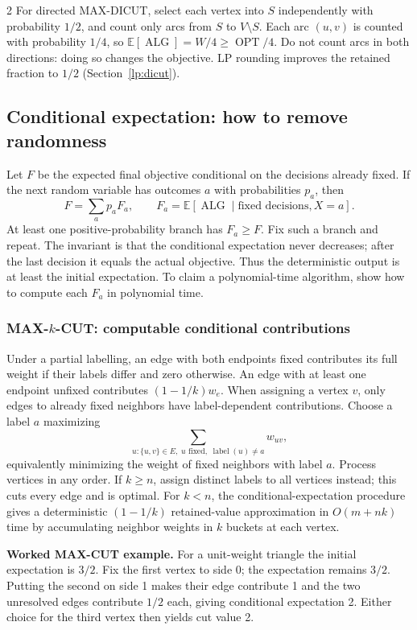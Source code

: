 \documentclass[8pt]{extarticle}
\theoremstyle{definition}
\newcommand{\OPT}{\operatorname{OPT}}
\newcommand{\ALG}{\operatorname{ALG}}
\begin{document}
\begin{multicols*}{2}
For directed MAX-DICUT, select each vertex into $S$ independently with
probability $1/2$, and count only arcs from $S$ to $V\setminus S$.
Each arc $(u,v)$ is counted with probability $1/4$, so
$\mathbb E[\ALG]=W/4\ge\OPT/4$.
Do not count arcs in both directions: doing so changes the objective.
LP rounding improves the retained fraction to $1/2$
(Section~\ref{lp:dicut}).

\subsection{Conditional expectation: how to remove randomness}\label{ra:conditional}
Let $F$ be the expected final objective conditional on the decisions already
fixed. If the next random variable has outcomes $a$ with probabilities $p_a$,
then
\[
  F=\sum_a p_a F_a,\qquad
  F_a=\mathbb E[\ALG\mid\text{fixed decisions},X=a].
\]
At least one positive-probability branch has $F_a\ge F$. Fix such a branch and
repeat. The invariant is that the conditional expectation never decreases;
after the last decision it equals the actual objective. Thus the deterministic
output is at least the initial expectation. To claim a polynomial-time
algorithm, show how to compute each $F_a$ in polynomial time.

\subsubsection*{MAX-$k$-CUT: computable conditional contributions}
Under a partial labelling, an edge with both endpoints fixed contributes its
full weight if their labels differ and zero otherwise. An edge with at least
one endpoint unfixed contributes $(1-1/k)w_e$. When assigning a vertex $v$,
only edges to already fixed neighbors have label-dependent contributions.
Choose a label $a$ maximizing
\[
  \sum_{u:\{u,v\}\in E,\;u\text{ fixed},\;\operatorname{label}(u)\ne a}w_{uv},
\]
equivalently minimizing the weight of fixed neighbors with label $a$.
Process vertices in any order. If $k\ge n$, assign distinct labels to all
vertices instead; this cuts every edge and is optimal. For $k<n$, the
conditional-expectation procedure gives a deterministic
$(1-1/k)$ retained-value approximation in $O(m+nk)$ time by accumulating
neighbor weights in $k$ buckets at each vertex.

\textbf{Worked MAX-CUT example.}
For a unit-weight triangle the initial expectation is $3/2$. Fix the first
vertex to side 0; the expectation remains $3/2$. Putting the second on side 1
makes their edge contribute 1 and the two unresolved edges contribute $1/2$
each, giving conditional expectation 2. Either choice for the third vertex
then yields cut value 2.


\end{multicols*}
\end{document}
